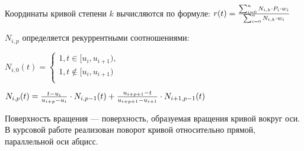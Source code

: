 Координаты кривой степени $k$ вычисляются по формуле: $r(t) = {{ {\sum_{i=0}^{n} N_{i, k} \cdot P_i \cdot w_i } } \over { {\sum_{i=0}^{n} N_{i, k} \cdot w_i } }}$

$N_{i, p}$ определяется рекуррентными соотношениями:

$N_{i, 0}(t) = {
\begin{cases}
1, t \in [u_i, u_{i + 1}), \\
1, t \notin [u_i, u_{i + 1}) \\
\end{cases}
}$

$N_{i, p}(t) = {{t - u_i} \over {u_{i + p} - u_i}} \cdot N_{i, p - 1}(t) + {{u_{i + p + 1} - t} \over {u_{i + p + 1} - u_{i + 1}}} \cdot N_{i + 1, p - 1}(t)$

Поверхность вращения --- поверхность, образуемая вращения кривой вокруг оси. В курсовой работе реализован поворот кривой относительно прямой, параллельной оси абцисс.
\pagebreak
